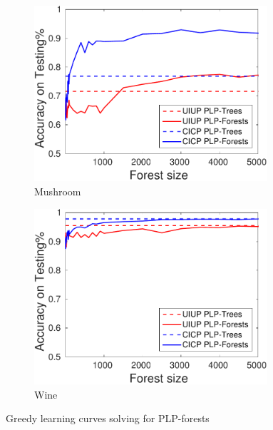 {\begin{figure}
    \begin{subfigure}[b]{0.3\textwidth}
      \centering
      \includegraphics[width=0.95\textwidth]{figs/PrefLearnResults/Forests/MushroomDownsampled_Forests_MH.pdf}
			\captionsetup{font=scriptsize}
      \caption{Mushroom}
    \end{subfigure}
    \begin{subfigure}[b]{0.3\textwidth}
      \centering
      \includegraphics[width=0.95\textwidth]{figs/PrefLearnResults/Forests/WineDownsampled_Forests_MH.pdf}
			\captionsetup{font=scriptsize}
      \caption{Wine}
    \end{subfigure}

    \caption{Greedy learning curves solving  for PLP-forests}
  \end{figure}
}


